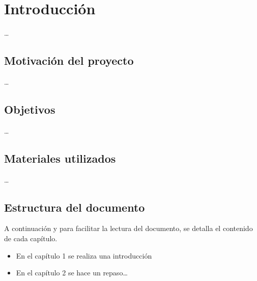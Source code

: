 \chapter{Introducción}

\ldots{}

\section{Motivación del proyecto}
\label{sec:org2c9e54d}

\ldots{}

\section{Objetivos}
\label{sec:org9bc5414}

\ldots{}

\section{Materiales utilizados}
\label{sec:org628dd31}

\ldots{}

\section{Estructura del documento}
\label{sec:orga38472e}

A continuación y para facilitar la lectura del documento, se detalla el contenido de cada capítulo.

\begin{itemize}
\item En el capítulo 1 se realiza una introducción
\item En el capítulo 2 se hace un repaso\ldots{}
\end{itemize}
